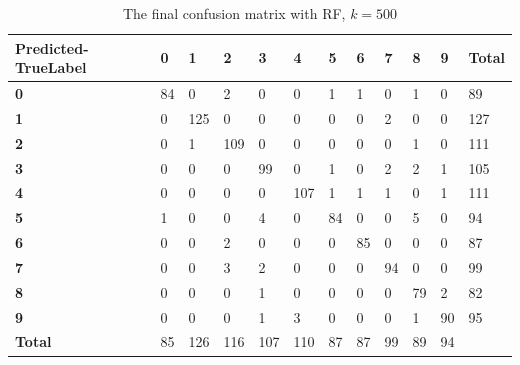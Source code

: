 \begin{table}[]
  \centering
\caption{The final confusion matrix with RF, $k = 500$}
\label{confusion_matrix_500}
\begin{tabular}{|l|l|l|l|l|l|l|l|l|l|l|l|}
\hline
\textbf{Predicted-TrueLabel} & \textbf{0} & \textbf{1} & \textbf{2} & \textbf{3} & \textbf{4} & \textbf{5} & \textbf{6} & \textbf{7} & \textbf{8} & \textbf{9} & \textbf{Total} \\ \hline
\textbf{0}                   & 84         & 0          & 2          & 0          & 0          & 1          & 1          & 0          & 1          & 0          & 89             \\ \hline
\textbf{1}                   & 0          & 125        & 0          & 0          & 0          & 0          & 0          & 2          & 0          & 0          & 127            \\ \hline
\textbf{2}                   & 0          & 1          & 109        & 0          & 0          & 0          & 0          & 0          & 1          & 0          & 111            \\ \hline
\textbf{3}                   & 0          & 0          & 0          & 99         & 0          & 1          & 0          & 2          & 2          & 1          & 105            \\ \hline
\textbf{4}                   & 0          & 0          & 0          & 0          & 107        & 1          & 1          & 1          & 0          & 1          & 111            \\ \hline
\textbf{5}                   & 1          & 0          & 0          & 4          & 0          & 84         & 0          & 0          & 5          & 0          & 94             \\ \hline
\textbf{6}                   & 0          & 0          & 2          & 0          & 0          & 0          & 85         & 0          & 0          & 0          & 87             \\ \hline
\textbf{7}                   & 0          & 0          & 3          & 2          & 0          & 0          & 0          & 94         & 0          & 0          & 99             \\ \hline
\textbf{8}                   & 0          & 0          & 0          & 1          & 0          & 0          & 0          & 0          & 79         & 2          & 82             \\ \hline
\textbf{9}                   & 0          & 0          & 0          & 1          & 3          & 0          & 0          & 0          & 1          & 90         & 95             \\ \hline
\textbf{Total}               & 85         & 126        & 116        & 107        & 110        & 87         & 87         & 99         & 89         & 94         &                \\ \hline
\end{tabular}
\end{table}


